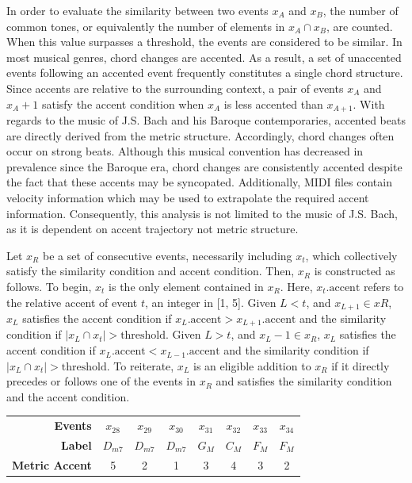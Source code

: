 \documentclass{article} %
\begin{document}
In order to evaluate the similarity between two events $x_A$ and $x_B$, the number of common tones, or equivalently the number of elements in $x_A \cap x_B$, are counted. When this value surpasses a threshold, the events are considered to be similar. In most musical genres, chord changes are accented. As a result, a set of unaccented events following an accented event frequently constitutes a single chord structure. Since accents are relative to the surrounding context, a pair of events $x_A$ and $x_A+1$ satisfy the accent condition when $x_A$ is less accented than $x_{A+1}$. With regards to the music of J.S. Bach and his Baroque contemporaries, accented beats are directly derived from the metric structure. Accordingly, chord changes often occur on strong beats. Although this musical convention has decreased in prevalence since the Baroque era, chord changes are consistently accented despite the fact that these accents may be syncopated. Additionally, MIDI files contain velocity information which may be used to extrapolate the required accent information. Consequently, this analysis is not limited to the music of J.S. Bach, as it is dependent on accent trajectory not metric structure.

Let $x_R$ be a set of consecutive events, necessarily including $x_t$, which collectively satisfy the similarity condition and accent condition. Then, $x_R$ is constructed as follows. To begin, $x_t$ is the only element contained in $x_R$. Here, $x_t.\text{accent}$ refers to the relative accent of event $t$, an integer in [1, 5]. Given $L < t$, and $x_{L+1} \in xR$, $x_L$ satisfies the accent condition if $x_L.\text{accent} > x_{L+1}.\text{accent}$ and the similarity condition if $|x_L \cap x_t| > \text{threshold}$. Given $L > t$, and $x_L-1 \in x_R$, $x_L$ satisfies the accent condition if $x_L.\text{accent} < x_{L-1}.\text{accent}$ and the similarity condition if $|x_L \cap x_t| > \text{threshold}$. To reiterate, $x_L$ is an eligible addition to $x_R$ if it directly precedes or follows one of the events in $x_R$ and satisfies the similarity condition and the accent condition.

\begin{tabular}{ r | c c c c c c c }
  \textbf{Events}        & $x_{28}$ & $x_{29}$ & $x_{30}$ & $x_{31}$ & $x_{32}$ & $x_{33}$ & $x_{34}$ \\
  \textbf{Label}         & $D_{m7}$ & $D_{m7}$ & $D_{m7}$ & $G_M$ & $C_M$ & $F_M$ & $F_M$ \\
  \textbf{Metric Accent} & 5 & 2 & 1 & 3 & 4 & 3 & 2 \\
\end{tabular}
\end{document}

